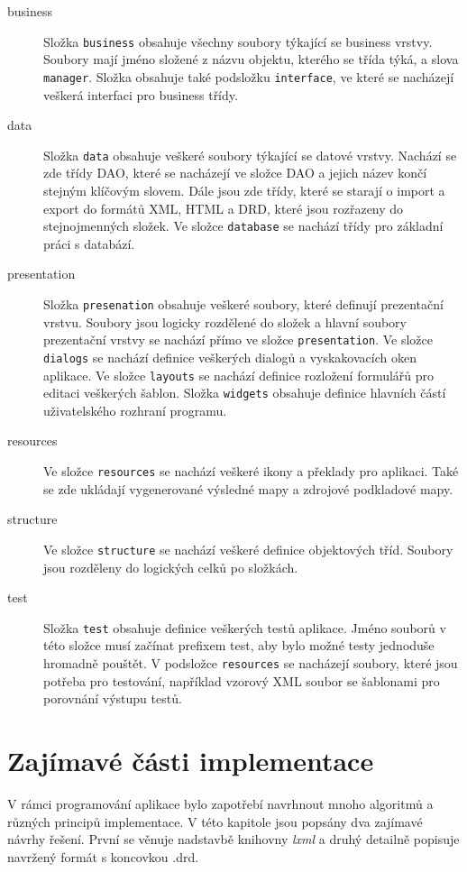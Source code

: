 \documentclass[thesis=B,czech]{resources/FITthesis}[2012/06/26]
\begin{document}
\begin{description}
\item[business] Složka \texttt{business} obsahuje všechny soubory týkající se business vrstvy. Soubory mají jméno složené z názvu objektu, kterého se třída týká, a slova \texttt{manager}. Složka obsahuje také podsložku \texttt{interface}, ve které se nacházejí veškerá interfaci pro business třídy.

\item[data] Složka \texttt{data} obsahuje veškeré soubory týkající se datové vrstvy. Nachází se zde třídy DAO, které se nacházejí ve složce DAO a jejich název končí stejným klíčovým slovem. Dále jsou zde třídy, které se starají o import a export do formátů XML, HTML a DRD, které jsou rozřazeny do stejnojmenných složek. Ve složce \texttt{database} se nachází třídy pro základní práci s databází.

\item[presentation]Složka \texttt{presenation} obsahuje veškeré soubory, které definují prezentační vrstvu. Soubory jsou logicky rozdělené do složek a hlavní soubory prezentační vrstvy se nachází přímo ve složce \texttt{presentation}. Ve složce \texttt{dialogs} se nachází definice veškerých dialogů a vyskakovacích oken aplikace. Ve složce \texttt{layouts} se nachází definice rozložení formulářů pro editaci veškerých šablon. Složka \texttt{widgets} obsahuje definice hlavních částí uživatelského rozhraní programu.

\item[resources] Ve složce \texttt{resources} se nachází veškeré ikony a překlady pro aplikaci. Také se zde ukládají vygenerované výsledné mapy a zdrojové podkladové mapy.

\item[structure] Ve složce \texttt{structure} se nachází veškeré definice objektových tříd. Soubory jsou rozděleny do logických celků po složkách.

\item[test] Složka \texttt{test} obsahuje definice veškerých testů aplikace. Jméno souborů v této složce musí začínat prefixem test, aby bylo možné testy jednoduše hromadně pouštět. V podsložce \texttt{resources} se nacházejí soubory, které jsou potřeba pro testování, například vzorový XML soubor se šablonami pro porovnání výstupu testů.
\end{description}

\section{Zajímavé části implementace}
V rámci programování aplikace bylo zapotřebí navrhnout mnoho algoritmů a různých principů implementace. V této kapitole jsou popsány dva zajímavé návrhy řešení. První se věnuje nadstavbě knihovny \textit{lxml} a druhý detailně popisuje navržený formát s koncovkou .drd.
\end{document}

